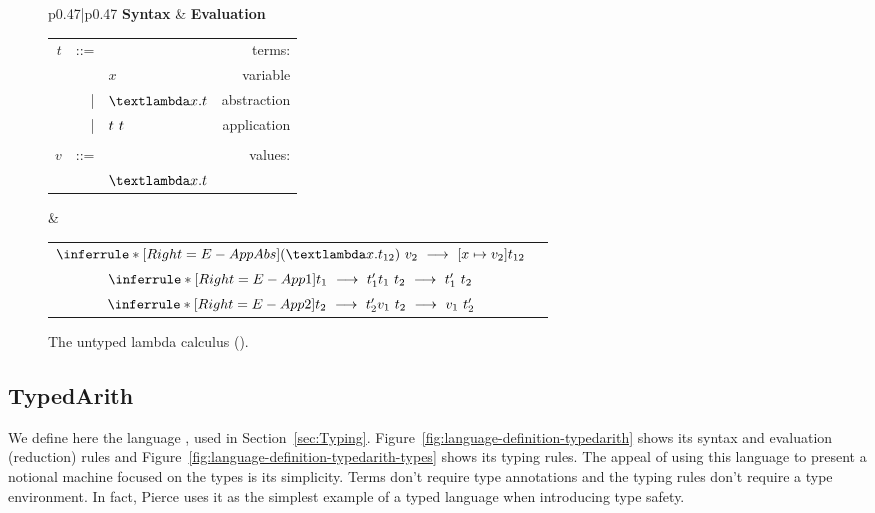\begin{figure*}[h]
\footnotesize
\begin{tabular}{p{}|p{}}
    \textbf{Syntax} & \textbf{Evaluation} \tabularnewline[1em]
    \begin{tabular}{r@{\hspace{0.5em}}r@{\hspace{0.5em}}lr}
        $t$ & ::= &              & terms:      \\
            &     & $x$          & variable    \\
            & |   & $\abs{x}{t}$ & abstraction \\
            & |   & $t\ t$ & application \\
            &     &              &             \\
        $v$ & ::= &              & values:     \\
            &     & $\abs{x}{t}$ &
    \end{tabular}
&
    \renewcommand{\arraystretch}{3.0}
    \begin{tabular}{cr}
        $\inferrule*[Right=E-AppAbs]
            { }
            {\app{(\abs{x}{t_{12}})}{v_2}\ \longrightarrow\ \subst{v_2}{x}{t_{12}}}$ \label{rule:E-AppAbs} & \\
        $\inferrule*[Right=E-App1]
            {t_1\ \longrightarrow\ t_1'}
            {\app{t_1}{t_2}\ \longrightarrow\ \app{t_1'}{t_2}}$ & \\
        $\inferrule*[Right=E-App2]
            {t_2\ \longrightarrow\ t_2'}
            {\app{v_1}{t_2}\ \longrightarrow\ \app{v_1}{t_2'}}$ & 
    \end{tabular}
\end{tabular}
\caption{The untyped lambda calculus ().}
\label{fig:language-definition-untypedlambda}
\end{figure*}
  

\subsection{TypedArith}
\label{sec:language-definition-typedarith}

We define here the language ,
used in Section~\ref{sec:Typing}.
Figure~\ref{fig:language-definition-typedarith}
shows its syntax and evaluation (reduction) rules
and Figure~\ref{fig:language-definition-typedarith-types}
shows its typing rules.
%
The appeal
of using this language to present a notional machine
focused on the types is its simplicity.
Terms don't require type annotations
and the typing rules don't require a type environment.
In fact,
Pierce uses it as
the simplest example of a typed language
when introducing type safety.




